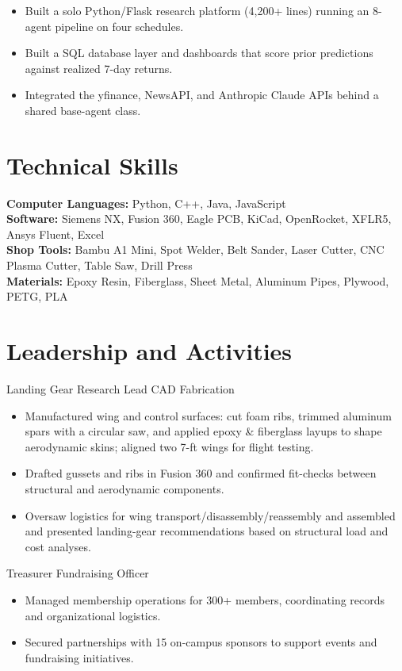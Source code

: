 \begin{itemize}
  \item Built a solo Python/Flask research platform (4,200+ lines) running an 8-agent pipeline on four schedules.
  \item Built a SQL database layer and dashboards that score prior predictions against realized 7-day returns.
  \item Integrated the yfinance, NewsAPI, and Anthropic Claude APIs behind a shared base-agent class.
\end{itemize}

\section{Technical Skills}
\textbf{Computer Languages:} Python, C++, Java, JavaScript\\
\textbf{Software:} Siemens NX, Fusion 360, Eagle PCB, KiCad, OpenRocket, XFLR5, Ansys Fluent, Excel\\
\textbf{Shop Tools:} Bambu A1 Mini, Spot Welder, Belt Sander, Laser Cutter, CNC Plasma Cutter, Table Saw, Drill Press\\
\textbf{Materials:} Epoxy Resin, Fiberglass, Sheet Metal, Aluminum Pipes, Plywood, PETG, PLA

\section{Leadership and Activities}

Landing Gear Research Lead \textbar{} CAD \textbar{} Fabrication
\begin{itemize}
  \item Manufactured wing and control surfaces: cut foam ribs, trimmed aluminum spars with a circular saw, and applied epoxy \& fiberglass layups to shape aerodynamic skins; aligned two 7-ft wings for flight testing.
  \item Drafted gussets and ribs in Fusion 360 and confirmed fit-checks between structural and aerodynamic components.
  \item Oversaw logistics for wing transport/disassembly/reassembly and assembled and presented landing-gear recommendations based on structural load and cost analyses.
\end{itemize}
\entrygap

Treasurer \textbar{} Fundraising Officer
\begin{itemize}
  \item Managed membership operations for 300+ members, coordinating records and organizational logistics.
  \item Secured partnerships with 15 on-campus sponsors to support events and fundraising initiatives.
\end{itemize}



